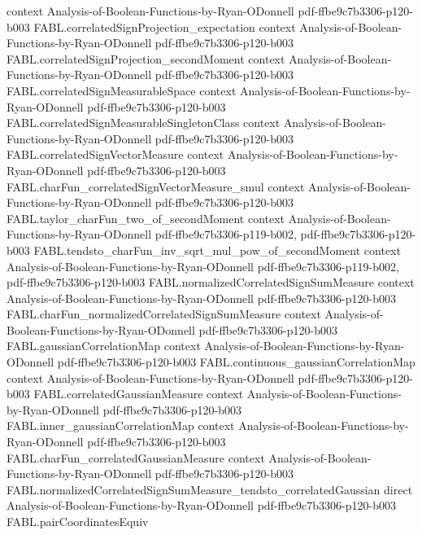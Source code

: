 \begin{theorem}
  {context}
  {Analysis-of-Boolean-Functions-by-Ryan-ODonnell}
  {pdf-ffbe9c7b3306-p120-b003}
\proofstep
  {FABL.correlatedSignProjection_expectation}
  {context}
  {Analysis-of-Boolean-Functions-by-Ryan-ODonnell}
  {pdf-ffbe9c7b3306-p120-b003}
\proofstep
  {FABL.correlatedSignProjection_secondMoment}
  {context}
  {Analysis-of-Boolean-Functions-by-Ryan-ODonnell}
  {pdf-ffbe9c7b3306-p120-b003}
\proofstep
  {FABL.correlatedSignMeasurableSpace}
  {context}
  {Analysis-of-Boolean-Functions-by-Ryan-ODonnell}
  {pdf-ffbe9c7b3306-p120-b003}
\proofstep
  {FABL.correlatedSignMeasurableSingletonClass}
  {context}
  {Analysis-of-Boolean-Functions-by-Ryan-ODonnell}
  {pdf-ffbe9c7b3306-p120-b003}
\proofstep
  {FABL.correlatedSignVectorMeasure}
  {context}
  {Analysis-of-Boolean-Functions-by-Ryan-ODonnell}
  {pdf-ffbe9c7b3306-p120-b003}
\proofstep
  {FABL.charFun_correlatedSignVectorMeasure_smul}
  {context}
  {Analysis-of-Boolean-Functions-by-Ryan-ODonnell}
  {pdf-ffbe9c7b3306-p120-b003}
\proofstep
  {FABL.taylor_charFun_two_of_secondMoment}
  {context}
  {Analysis-of-Boolean-Functions-by-Ryan-ODonnell}
  {pdf-ffbe9c7b3306-p119-b002,
    pdf-ffbe9c7b3306-p120-b003}
\proofstep
  {FABL.tendsto_charFun_inv_sqrt_mul_pow_of_secondMoment}
  {context}
  {Analysis-of-Boolean-Functions-by-Ryan-ODonnell}
  {pdf-ffbe9c7b3306-p119-b002,
    pdf-ffbe9c7b3306-p120-b003}
\proofstep
  {FABL.normalizedCorrelatedSignSumMeasure}
  {context}
  {Analysis-of-Boolean-Functions-by-Ryan-ODonnell}
  {pdf-ffbe9c7b3306-p120-b003}
\proofstep
  {FABL.charFun_normalizedCorrelatedSignSumMeasure}
  {context}
  {Analysis-of-Boolean-Functions-by-Ryan-ODonnell}
  {pdf-ffbe9c7b3306-p120-b003}
\proofstep
  {FABL.gaussianCorrelationMap}
  {context}
  {Analysis-of-Boolean-Functions-by-Ryan-ODonnell}
  {pdf-ffbe9c7b3306-p120-b003}
\proofstep
  {FABL.continuous_gaussianCorrelationMap}
  {context}
  {Analysis-of-Boolean-Functions-by-Ryan-ODonnell}
  {pdf-ffbe9c7b3306-p120-b003}
\proofstep
  {FABL.correlatedGaussianMeasure}
  {context}
  {Analysis-of-Boolean-Functions-by-Ryan-ODonnell}
  {pdf-ffbe9c7b3306-p120-b003}
\proofstep
  {FABL.inner_gaussianCorrelationMap}
  {context}
  {Analysis-of-Boolean-Functions-by-Ryan-ODonnell}
  {pdf-ffbe9c7b3306-p120-b003}
\proofstep
  {FABL.charFun_correlatedGaussianMeasure}
  {context}
  {Analysis-of-Boolean-Functions-by-Ryan-ODonnell}
  {pdf-ffbe9c7b3306-p120-b003}
\proofstep
  {FABL.normalizedCorrelatedSignSumMeasure_tendsto_correlatedGaussian}
  {direct}
  {Analysis-of-Boolean-Functions-by-Ryan-ODonnell}
  {pdf-ffbe9c7b3306-p120-b003}
\proofstep
  {FABL.pairCoordinatesEquiv}

\end{theorem}
